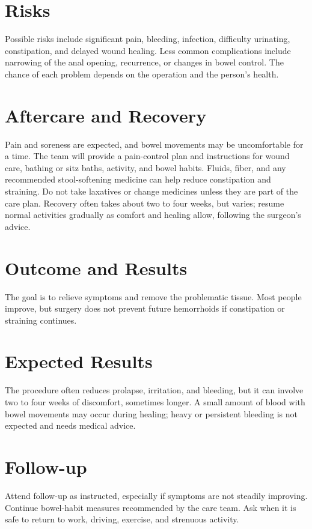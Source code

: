 \section*{Risks}
Possible risks include significant pain, bleeding, infection, difficulty urinating, constipation, and delayed wound healing. Less common complications include narrowing of the anal opening, recurrence, or changes in bowel control. The chance of each problem depends on the operation and the person's health.

\section*{Aftercare and Recovery}
Pain and soreness are expected, and bowel movements may be uncomfortable for a time. The team will provide a pain-control plan and instructions for wound care, bathing or sitz baths, activity, and bowel habits. Fluids, fiber, and any recommended stool-softening medicine can help reduce constipation and straining. Do not take laxatives or change medicines unless they are part of the care plan. Recovery often takes about two to four weeks, but varies; resume normal activities gradually as comfort and healing allow, following the surgeon's advice.

\section*{Outcome and Results}
The goal is to relieve symptoms and remove the problematic tissue. Most people improve, but surgery does not prevent future hemorrhoids if constipation or straining continues.

\section*{Expected Results}
The procedure often reduces prolapse, irritation, and bleeding, but it can involve two to four weeks of discomfort, sometimes longer. A small amount of blood with bowel movements may occur during healing; heavy or persistent bleeding is not expected and needs medical advice.

\section*{Follow-up}
Attend follow-up as instructed, especially if symptoms are not steadily improving. Continue bowel-habit measures recommended by the care team. Ask when it is safe to return to work, driving, exercise, and strenuous activity.

